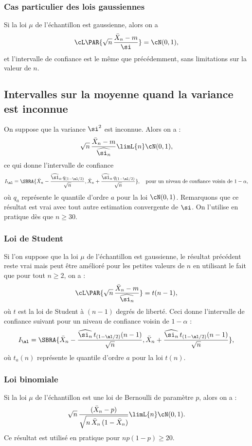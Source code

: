 \subsubsection{Cas particulier des lois gaussiennes}

Si la loi $\mu$ de l'échantillon est gaussienne, alors on a
$$
\cL\PAR{\sqrt{n}\,\frac{\bar{X}_n-m}{\si}} = \cN(0,1),
$$
et l'intervalle de confiance est le même que précédemment, sans limitations
sur la valeur de $n$.


\subsection{Intervalles sur la moyenne quand la variance est inconnue} 

On suppose que la variance $\si^2$ est inconnue. Alors on a :
$$
\sqrt{n}\,\frac{\bar{X}_n-m}{\widehat{\si_n}} \limL{n} \cN(0,1),
$$
ce qui donne l'intervalle de confiance
$$
I_\al=\SBRA{\bar{X}_n-\frac{\widehat{\si}_n\,q_{(1-\al/2)}}{\sqrt{n}},
  \bar{X}_n+\frac{\widehat{\si}_n\,q_{(1-\al/2)}}{\sqrt{n}}},
\text{\quad pour un niveau de confiance voisin de $1-\alpha$},
$$
où $q_a$ représente le quantile d'ordre $a$ pour la loi $\cN(0,1)$.
Remarquons que ce résultat est vrai avec tout autre estimation convergente
de $\si$. On l'utilise en pratique dès que $n \geq 30$.

\subsubsection{Loi de Student} 

Si l'on suppose que la loi $\mu$ de l'échantillon est gaussienne, le résultat
précédent reste vrai mais peut être amélioré pour les petites valeurs de $n$
en utilisant le fait que pour tout $n\geq 2$, on a :
$$
\cL\PAR{\sqrt{n}\,\frac{\bar{X}_n-m}{\widehat{\si_n}}} = t(n-1),
$$
où $t$ est la loi de Student à $(n-1)$ degrés de liberté. Ceci donne
l'intervalle de confiance suivant pour un niveau de confiance voisin de
$1-\alpha$ :
$$
I_\al=\SBRA{\bar{X}_n-\frac{\widehat{\si_n}\,t_{(1-\al/2)}(n-1)}{\sqrt{n}},
  \bar{X}_n+\frac{\widehat{\si_n}\,t_{(1-\al/2)}(n-1)}{\sqrt{n}}},
$$
où $t_a(n)$ représente le quantile d'ordre $a$ pour la loi $t(n)$.

\subsubsection{Loi binomiale} 

Si la loi $\mu$ de l'échantillon est une loi de Bernoulli de paramètre $p$,
alors on a :
$$
\sqrt{n}\,\frac{(\bar{X}_n-p)}{\sqrt{n\,\bar{X}_n\,(1-\bar{X}_n)}}
\limL{n}\cN(0,1).
$$
Ce résultat est utilisé en pratique pour $np(1-p)\geq 20$.


